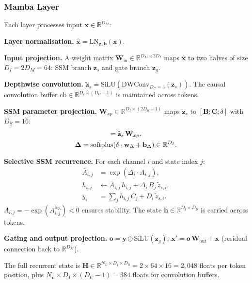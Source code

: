 \documentclass[10pt,twocolumn]{article}
\newcommand{\RR}{\mathbb{R}}
\begin{document}
\subsubsection{Mamba Layer}

Each layer processes input $\mathbf{x}\in\RR^{D_M}$:

\smallskip
\noindent\textbf{Layer normalisation.}
$\hat{\mathbf{x}} = \mathrm{LN}_{\mathbf{g},\mathbf{b}}(\mathbf{x})$.

\smallskip
\noindent\textbf{Input projection.}
A weight matrix $\mathbf{W}_\text{in}\in\RR^{D_M\times 2D_I}$ maps
$\hat{\mathbf{x}}$ to two halves of size $D_I=2D_M=64$:
SSM branch $\mathbf{z}_s$ and gate branch $\mathbf{z}_g$.

\smallskip
\noindent\textbf{Depthwise convolution.}
$\tilde{\mathbf{z}}_s = \mathrm{SiLU}(\mathrm{DWConv}_{D_C=4}(\mathbf{z}_s))$.
The causal convolution buffer $\mathrm{cb}\in\RR^{D_I\times(D_C-1)}$
is maintained across tokens.

\smallskip
\noindent\textbf{SSM parameter projection.}
$\mathbf{W}_{xp}\in\RR^{D_I\times(2D_S+1)}$ maps
$\tilde{\mathbf{z}}_s$ to $[\mathbf{B};\mathbf{C};\delta]$
with $D_S=16$:
\begin{gather}
  [\mathbf{B};\mathbf{C};\delta]
  = \tilde{\mathbf{z}}_s\,\mathbf{W}_{xp},\notag\\
  \boldsymbol{\Delta} = \mathrm{softplus}(\delta\cdot\mathbf{w}_\Delta+\mathbf{b}_\Delta)\in\RR^{D_I}.
\end{gather}

\smallskip
\noindent\textbf{Selective SSM recurrence.}
For each channel $i$ and state index $j$:
\begin{align}
  \bar{A}_{i,j} &= \exp(\Delta_i\cdot A_{i,j}), \label{eq:dA}\\
  h_{i,j}       &\leftarrow \bar{A}_{i,j}\,h_{i,j}
                 + \Delta_i\,B_j\,\tilde{z}_{s,i}, \label{eq:hup}\\
  y_i           &= \textstyle\sum_j h_{i,j}\,C_j + D_i\,\tilde{z}_{s,i}.
\end{align}
$A_{i,j}=-\exp(A^\text{log}_{i,j})<0$ ensures stability.
The state $\mathbf{h}\in\RR^{D_I\times D_S}$ is carried across tokens.

\smallskip
\noindent\textbf{Gating and output projection.}
$\mathbf{o} = \mathbf{y}\odot\mathrm{SiLU}(\mathbf{z}_g)$;
$\mathbf{x}' = \mathbf{o}\,\mathbf{W}_\text{out} + \mathbf{x}$
(residual connection back to $\RR^{D_M}$).

The full recurrent state is
$\mathbf{H}\in\RR^{N_L\times D_I\times D_S}
= 2\times64\times16 = 2{,}048$ floats per token position,
plus $N_L\times D_I\times(D_C-1)=384$ floats for convolution buffers.
\end{document}
